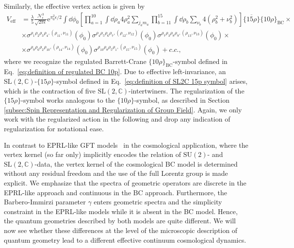 \documentclass[11pt,a4paper]{article}
\newcommand{\C}{\mathbb C}
\newcommand{\e}{\textrm{e}}
\newcommand{\SU}{\text{SU$(2)$}}
\newcommand{\SL}{\text{SL$(2,\C)$}}
\begin{document}
Similarly, the effective vertex action is given by 
%
\begin{equation}\label{eq:vertex action in spin representation}
\begin{aligned}
V_{\text{eff}} &= \frac{\lambda}{5}\frac{\mathcal{N}_{\epsilon}^3}{\sqrt{2\pi\epsilon}}\e^{\pi_0^2\epsilon/2}\int\dd{\phi_0}\left[\prod_{a=1}^{10}\int\dd{\rho_a}4\rho_{a}^2\sum_{j_a m_a}\prod_{b=11}^{15}\int\dd{\rho_b}\sum_{\nu_b}4\left(\rho_b^2+\nu_b^2\right)\right]\overline{\{15\rho\}}\{10\rho\}_{\text{BC}}\times\\[7pt]
& \times
\sigma^{\rho_1 \rho_2 \rho_3 \rho_4,(\rho_{11},\nu_{11})}(\phi_0)\sigma^{\rho_4 \rho_5 \rho_6 \rho_7,(\rho_{12},\nu_{12})}(\phi_0)\sigma^{\rho_7 \rho_3 \rho_8 \rho_9,(\rho_{13},\nu_{13})}(\phi_0)\times\\[7pt]
& \times
\sigma^{\rho_9 \rho_6 \rho_2 \rho_{10},(\rho_{14},\nu_{14})}(\phi_0)\sigma^{\rho_{10} \rho_8 \rho_5 \rho_1 ,(\rho_{15},\nu_{15})}(\phi_0)+c.c.,
\end{aligned}
\end{equation}
%
where we recognize the regulated Barrett-Crane $\{10\rho\}_{\text{BC}}$-symbol defined in Eq.~\eqref{eq:definition of regulated BC 10p}. Due to effective left-invariance, an $\SL$-$\{15\rho\}$-symbol defined in Eq.~\eqref{eq:definition of SL2C 15p symbol} arises, which is the contraction of five $\SL$-intertwiners. The regularization of the $\{15\rho\}$-symbol works analogous to the $\{10\rho\}$-symbol, as described in Section \ref{subsec:Spin Representation and Regularization of Group Field}. Again, we only work with the regularized action in the following and drop any indication of regularization for notational ease. 

In contrast to EPRL-like GFT models~\cite{Oriti:2016qtz,Gielen:2014ila,Gielen:2013naa,Pithis:2019tvp,Pithis:2016cxg} in the cosmological  application, where the vertex kernel (so far only) implicitly encodes the relation of $\SU$- and $\SL$-data, the vertex kernel of the cosmological BC model is determined without any residual freedom and the use of the full Lorentz group is made explicit. We emphasize that the spectra of geometric operators are discrete in the EPRL-like approach and continuous in the BC approach.  Furthermore, the Barbero-Immirzi parameter $\gamma$ enters geometric spectra and the simplicity constraint in the EPRL-like models while it is absent in the BC model. Hence, the quantum geometries described by both models are quite different. We will now see whether these differences at the level of the microscopic description of quantum geometry lead to a different effective continuum cosmological dynamics. 
\end{document}
